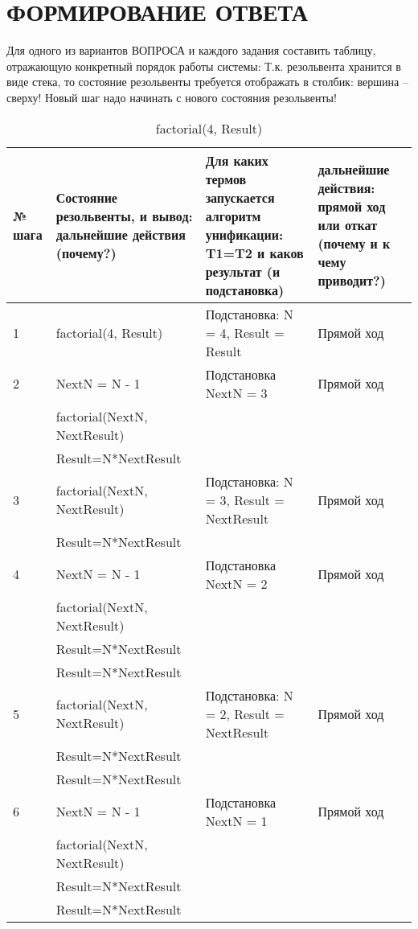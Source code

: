\section{ФОРМИРОВАНИЕ ОТВЕТА}

Для одного из вариантов ВОПРОСА и каждого задания  составить таблицу, отражающую конкретный порядок работы системы: Т.к. резольвента хранится в виде стека, то состояние резольвенты требуется отображать в столбик: вершина – сверху! Новый шаг надо начинать с нового состояния резольвенты!

{
\small
\begin{longtable}{|p{1.15cm}|p{4cm}|p{6cm}|p{6cm}|}
    \caption{factorial(4, Result)} \\
    \hline
    № шага & Состояние резольвенты, и вывод: дальнейшие действия (почему?) & Для каких термов запускается алгоритм унификации: T1=T2 и каков результат (и подстановка) & дальнейшие действия: прямой ход или откат (почему и к чему приводит?) \\
    \hline
    1 & factorial(4, Result) & Подстановка: N = 4, Result = Result & Прямой ход \\
    \hline
    2 & NextN = N - 1 & Подстановка NextN = 3 & Прямой ход \\
      & factorial(NextN, NextResult) & & \\
      & Result=N*NextResult & & \\
    \hline
    3 & factorial(NextN, NextResult) & Подстановка: N = 3, Result = NextResult & Прямой ход \\
      & Result=N*NextResult & & \\
    \hline
    4 & NextN = N - 1 & Подстановка NextN = 2 & Прямой ход \\
      & factorial(NextN, NextResult) & & \\
      & Result=N*NextResult & & \\
      & Result=N*NextResult & & \\
    \hline
    5 & factorial(NextN, NextResult) & Подстановка: N = 2, Result = NextResult & Прямой ход \\
      & Result=N*NextResult & & \\
      & Result=N*NextResult & & \\
    \hline
    6 & NextN = N - 1 & Подстановка NextN = 1 & Прямой ход \\
      & factorial(NextN, NextResult) & & \\
      & Result=N*NextResult & & \\
      & Result=N*NextResult & & \\

\end{longtable}}
